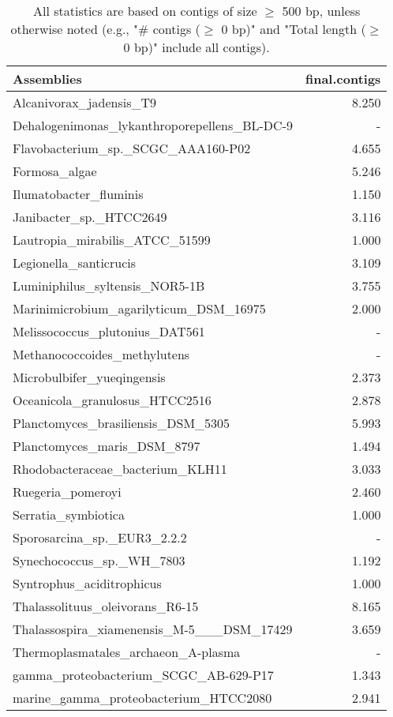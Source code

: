 \documentclass[12pt,a4paper]{article}
\begin{document}
\begin{table}[ht]
\begin{center}
\caption{All statistics are based on contigs of size $\geq$ 500 bp, unless otherwise noted (e.g., "\# contigs ($\geq$ 0 bp)" and "Total length ($\geq$ 0 bp)" include all contigs).}
\begin{tabular}{|l*{1}{|r}|}
\hline
Assemblies & final.contigs \\ \hline
Alcanivorax\_jadensis\_T9 & 8.250 \\ \hline
Dehalogenimonas\_lykanthroporepellens\_BL-DC-9 & - \\ \hline
Flavobacterium\_sp.\_SCGC\_AAA160-P02 & 4.655 \\ \hline
Formosa\_algae & 5.246 \\ \hline
Ilumatobacter\_fluminis & 1.150 \\ \hline
Janibacter\_sp.\_HTCC2649 & 3.116 \\ \hline
Lautropia\_mirabilis\_ATCC\_51599 & 1.000 \\ \hline
Legionella\_santicrucis & 3.109 \\ \hline
Luminiphilus\_syltensis\_NOR5-1B & 3.755 \\ \hline
Marinimicrobium\_agarilyticum\_DSM\_16975 & 2.000 \\ \hline
Melissococcus\_plutonius\_DAT561 & - \\ \hline
Methanococcoides\_methylutens & - \\ \hline
Microbulbifer\_yueqingensis & 2.373 \\ \hline
Oceanicola\_granulosus\_HTCC2516 & 2.878 \\ \hline
Planctomyces\_brasiliensis\_DSM\_5305 & 5.993 \\ \hline
Planctomyces\_maris\_DSM\_8797 & 1.494 \\ \hline
Rhodobacteraceae\_bacterium\_KLH11 & 3.033 \\ \hline
Ruegeria\_pomeroyi & 2.460 \\ \hline
Serratia\_symbiotica & 1.000 \\ \hline
Sporosarcina\_sp.\_EUR3\_2.2.2 & - \\ \hline
Synechococcus\_sp.\_WH\_7803 & 1.192 \\ \hline
Syntrophus\_aciditrophicus & 1.000 \\ \hline
Thalassolituus\_oleivorans\_R6-15 & 8.165 \\ \hline
Thalassospira\_xiamenensis\_M-5\_\_\_DSM\_17429 & 3.659 \\ \hline
Thermoplasmatales\_archaeon\_A-plasma & - \\ \hline
gamma\_proteobacterium\_SCGC\_AB-629-P17 & 1.343 \\ \hline
marine\_gamma\_proteobacterium\_HTCC2080 & 2.941 \\ \hline
\end{tabular}
\end{center}
\end{table}
\end{document}
